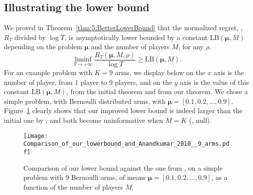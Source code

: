 \label{app:5:moreplots}



\subsection*{Illustrating the lower bound}
\label{app:5:illustrationLowerBound}


We proved in Theorem~\ref{thm:5:BetterLowerBound} that the normalized regret, \ie, $R_T$ divided by
$\log T$, is asymptotically lower bounded by a constant $\mathrm{LB}(\boldsymbol{\mu}, M)$
depending on the problem $\boldsymbol{\mu}$ and the number of players $M$, for any $\rho$.
\begin{equation}
  \mathop{\lim\inf}\limits_{T \to +\infty} \frac{R_T(\boldsymbol{\mu}, M, \rho)}{\log T} \geq \mathrm{LB}(\boldsymbol{\mu}, M).
\end{equation}
%
For an example problem with $K = 9$ arms, we display below on the $x$ axis is
the number of player, from $1$ player to $9$ players, and on the
$y$ axis is the value of this constant $\mathrm{LB}(\boldsymbol{\mu}, M)$, from the initial
theorem and from our theorem.
We chose a simple problem, with Bernoulli
distributed arms, with $\boldsymbol{\mu} = [0.1, 0.2, \dots, 0.9]$.
%
Figure~\ref{fig:5:CompLowerBounds} clearly shows that our improved lower bound is indeed larger than the initial one by \cite{Zhao10},
and both become uninformative when $M=K$ (\ie, null).

\begin{figure}[h!]
  \centering
  \texttt{[image: Comparison\_of\_our\_lowerbound\_and\_Anandkumar\_2010\_\_9\_arms.pdf]}
  \caption[Comparison of our lower bound against the one from \cite{Zhao10}]{Comparison of our lower bound against the one from \cite{Zhao10}, on a simple problem with $9$ Bernoulli arms, of means $\boldsymbol{\mu} = [0.1, 0.2, \dots, 0.9]$, as a function of the number of players $M$.}
  \label{fig:5:CompLowerBounds}
\end{figure}




